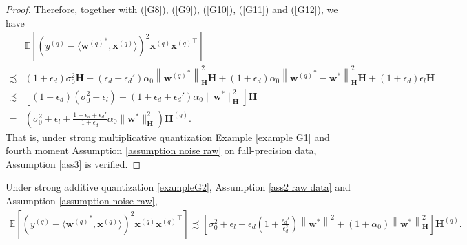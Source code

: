 \documentclass[11pt, letterpaper]{article}
\begin{document}
\begin{proof}
    Therefore, together with (\ref{G8}), (\ref{G9}), (\ref{G10}), (\ref{G11}) and (\ref{G12}), we have
    \begin{equation*}
        \begin{aligned}
            &\mathbb{E}\left[(y^{(q)}-\langle {\mathbf{w}^{(q)}}^*,\mathbf{x}^{(q)}\rangle)^2{\mathbf{x}^{(q)}}{\mathbf{x}^{(q)}}^\top\right]\\
            \precsim & (1+\epsilon_d)\sigma_0^2\mathbf{H}+(\epsilon_d+\epsilon_d')\alpha_0\left\|{\mathbf{w}^{(q)}}^*\right\|_\mathbf{H}^2\mathbf{H}
            +(1+\epsilon_d)\alpha_0\left\|{\mathbf{w}^{(q)}}^*- \mathbf{w}^*\right\|_\mathbf{H}^2\mathbf{H}+(1+\epsilon_d)\epsilon_l\mathbf{H}\\
            \precsim& \left[(1+\epsilon_d)(\sigma_0^2+\epsilon_l)+(1+\epsilon_d+\epsilon_d')\alpha_0\|\mathbf{w}^*\|_\mathbf{H}^2\right]\mathbf{H}\\
            =&\left(\sigma_0^2+\epsilon_l+\frac{1+\epsilon_d+\epsilon_d'}{1+\epsilon_d}\alpha_0\|\mathbf{w}^*\|_\mathbf{H}^2\right)\mathbf{H}^{(q)}.
        \end{aligned}
    \end{equation*}
    That is, under strong multiplicative quantization Example \ref{example G1} and fourth moment Assumption \ref{assumption noise raw} on full-precision data, Assumption \ref{ass3} is verified.
\end{proof}
\begin{lemma}
    Under strong additive quantization \ref{exampleG2}, Assumption \ref{ass2 raw data} and Assumption \ref{assumption noise raw},
    \begin{equation*}
        \begin{aligned}
            \mathbb{E}\left[(y^{(q)}-\langle {\mathbf{w}^{(q)}}^*,\mathbf{x}^{(q)}\rangle)^2{\mathbf{x}^{(q)}}{\mathbf{x}^{(q)}}^\top\right]
            \precsim\left[\sigma_0^2+\epsilon_l+\epsilon_d(1+\frac{\epsilon_d'}{\epsilon_d^2})\left\|{\mathbf{w}}^*\right\|^2+(1+\alpha_0)\left\|{\mathbf{w}}^*\right\|_\mathbf{H}^2\right]\mathbf{H}^{(q)}.
        \end{aligned}
    \end{equation*}
\end{lemma}
\end{document}
